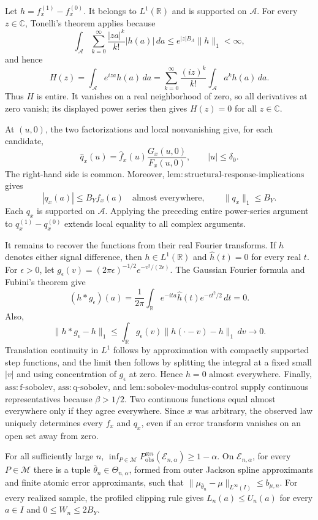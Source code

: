 Let \(h=f_x^{(1)}-f_x^{(0)}\).  It belongs to \(L^1(\mathbb R)\) and is supported on \(\mathcal A\).  For every \(z\in\mathbb C\), Tonelli's theorem applies because
\[
 \int_{\mathcal A}\sum_{k=0}^{\infty}
 \frac{|za|^k}{k!}|h(a)|\,da
 \le e^{|z|B_A}\|h\|_1<\infty,
\]
and hence
\[
 H(z)=\int_{\mathcal A}e^{iza}h(a)\,da
 =\sum_{k=0}^{\infty}\frac{(iz)^k}{k!}
   \int_{\mathcal A}a^kh(a)\,da.
\]
Thus \(H\) is entire.  It vanishes on a real neighborhood of zero, so all derivatives at zero vanish; its displayed power series then gives \(H(z)=0\) for all \(z\in\mathbb C\).

At \((u,0)\), the two factorizations and local nonvanishing give, for each candidate,
\[
 \widehat q_x(u)=\widehat f_x(u)\frac{G_x(u,0)}{F_x(u,0)},
 \qquad |u|\le\delta_0.
\]
The right-hand side is common.  Moreover, \(\mathrm{lem{:}structural\text{-}response\text{-}implications}\) gives
\[
 |q_x(a)|\le B_Yf_x(a)\quad\text{almost everywhere},
 \qquad \|q_x\|_1\le B_Y.
\]
Each \(q_x\) is supported on \(\mathcal A\).  Applying the preceding entire power-series argument to \(q_x^{(1)}-q_x^{(0)}\) extends local equality to all complex arguments.

It remains to recover the functions from their real Fourier transforms.  If \(h\) denotes either signal difference, then \(h\in L^1(\mathbb R)\) and \(\widehat h(t)=0\) for every real \(t\).  For \(\epsilon>0\), let \(g_\epsilon(v)=(2\pi\epsilon)^{-1/2}e^{-v^2/(2\epsilon)}\).  The Gaussian Fourier formula and Fubini's theorem give
\[
 (h*g_\epsilon)(a)=\frac1{2\pi}\int_{\mathbb R}
 e^{-ita}\widehat h(t)e^{-\epsilon t^2/2}\,dt=0.
\]
Also,
\[
 \|h*g_\epsilon-h\|_1
 \le\int_{\mathbb R}g_\epsilon(v)
       \|h(\cdot-v)-h\|_1\,dv\longrightarrow0.
\]
Translation continuity in \(L^1\) follows by approximation with compactly supported step functions, and the limit then follows by splitting the integral at a fixed small \(|v|\) and using concentration of \(g_\epsilon\) at zero.  Hence \(h=0\) almost everywhere.  Finally, \(\mathrm{ass{:}f\text{-}sobolev}\), \(\mathrm{ass{:}q\text{-}sobolev}\), and \(\mathrm{lem{:}sobolev\text{-}modulus\text{-}control}\) supply continuous representatives because \(\beta>1/2\).  Two continuous functions equal almost everywhere only if they agree everywhere.  Since \(x\) was arbitrary, the observed law uniquely determines every \(f_x\) and \(q_x\), even if an error transform vanishes on an open set away from zero.

For all sufficiently large \(n\), \(\inf_{P\in\mathcal M}P_{\mathrm{obs}}^{\otimes n}(\mathcal E_{n,\alpha})\ge1-\alpha\). On \(\mathcal E_{n,\alpha}\), for every \(P\in\mathcal M\) there is a tuple \(\bar\theta_n\in\Theta_{n,\alpha}\), formed from outer Jackson spline approximants and finite atomic error approximants, such that \(\|\mu_{\bar\theta_n}-\mu\|_{L^\infty(I)}\le b_{\mu,n}\). For every realized sample, the profiled clipping rule gives \(L_n(a)\le U_n(a)\) for every \(a\in I\) and \(0\le W_n\le2B_Y\).

